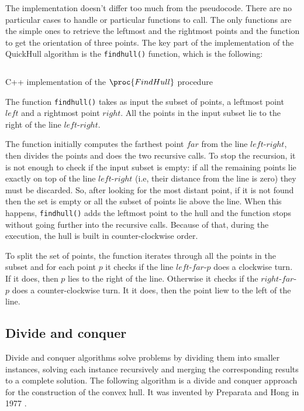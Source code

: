 \documentclass{article}
\begin{document}
The implementation doesn't differ too much from the pseudocode. There are no particular cases to handle or particular functions to call. The only functions are the simple ones to retrieve the leftmost and the rightmost points and the function to get the orientation of three points. The key part of the implementation of the QuickHull algorithm is the \texttt{findhull()} function, which is the following:

\begin{listing}[H]
    \inputminted[linenos]{cpp}{code/findhull.cpp}
    \caption{C++ implementation of the $\proc{FindHull}$ procedure}
\end{listing}

The function \texttt{findhull()} takes as input the subset of points, a leftmost point $left$ and a rightmost point $right$. All the points in the input subset lie to the right of the line $left$-$right$.

The function initially computes the farthest point $far$ from the line $left$-$right$, then divides the points and does the two recursive calls. To stop the recursion, it is not enough to check if the input subset is empty: if all the remaining points lie exactly on top of the line $left$-$right$ (i.e, their distance from the line is zero) they must be discarded. So, after looking for the most distant point, if it is not found then the set is empty or all the subset of points lie above the line. When this happens, \texttt{findhull()} adds the leftmost point to the hull and the function stops without going further into the recursive calls. Because of that, during the execution, the hull is built in counter-clockwise order.

To split the set of points, the function iterates through all the points in the subset and for each point $p$ it checks if the line $left$-$far$-$p$ does a clockwise turn. If it does, then $p$ lies to the right of the line. Otherwise it checks if the $right$-$far$-$p$ does a counter-clockwise turn. It it does, then the point liew to the left of the line.

\newpage
\subsection{Divide and conquer}

Divide and conquer algorithms solve problems by dividing them into smaller instances, solving each instance recursively and merging the corresponding results to a complete solution. The following algorithm is a divide and conquer approach for the construction of the convex hull. It was invented by Preparata and Hong in 1977 \cite{preparata}.
\end{document}
